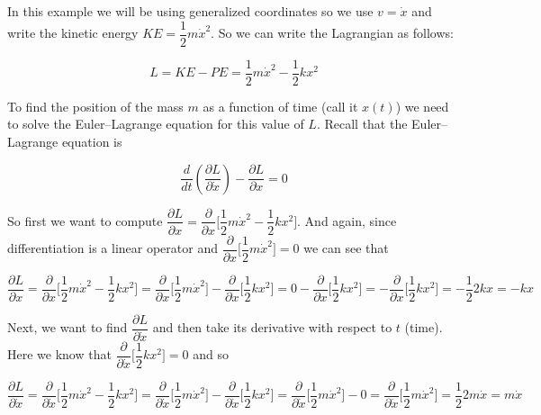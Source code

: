 \documentclass{article}
\theoremstyle{definition}
\begin{document}
\noindent
In this example we will be using generalized coordinates so we
use $v = \dot{x}$ and write the kinetic energy $KE = \dfrac{1}{2}
m \dot{x}^2$. So we can write the Lagrangian as follows:

\bigskip
\begin{equation*}
L = KE - PE = \dfrac{1}{2} m \dot{x}^2 - \dfrac{1}{2} k x^2
\end{equation*}


\bigskip
\noindent
To find the position of the mass $m$ as a function of time (call
it $x(t)$) we need to solve the Euler–Lagrange equation for this
value of $L$. Recall that the  Euler–Lagrange equation is


\bigskip
\begin{equation*}
\dfrac{d}{dt} \left ( \dfrac{\partial L}{\partial \dot{x}} \right ) -  \dfrac{\partial L}{\partial x} = 0
\end{equation*}

\bigskip
\noindent
So first we want to compute $\dfrac{\partial L}{\partial x} =
\dfrac{\partial}{\partial x}  \bigg [ \dfrac{1}{2} m \dot{x}^2  -
\dfrac{1}{2} k x^2 \bigg ]$. And again, since differentiation 
is a linear operator and $\dfrac{\partial}{\partial x} \bigg 
[\dfrac{1}{2} m \dot{x}^2 \bigg ] = 0$ we can see that  

\bigskip
\begin{equation*}
\dfrac{\partial L}{\partial x} = \dfrac{\partial}{\partial x}  \bigg [ \dfrac{1}{2} m \dot{x}^2  - \dfrac{1}{2} k x^2 \bigg ] 
= \dfrac{\partial}{\partial x} \bigg [\dfrac{1}{2} m \dot{x}^2  \bigg ] - \dfrac{\partial}{\partial x} \bigg [\dfrac{1}{2} k x^2  \bigg ]  
=  0 - \dfrac{\partial}{\partial x} \bigg [\dfrac{1}{2} k x^2  \bigg ] 
= - \dfrac{\partial}{\partial x} \bigg [ \dfrac{1}{2} k x^2  \bigg ]  
= - \dfrac{1}{2} 2 k x = -kx
\end{equation*}

\bigskip
\noindent
Next, we want to find  $\dfrac{\partial L}{\partial \dot{x}}$ and
then take its derivative with respect to $t$ (time). Here we know
that $\dfrac{\partial}{\partial \dot{x}} \Bigg [ \dfrac{1}{2} k
x^2 \Bigg ] = 0$ and so 


\begin{equation*}
\dfrac{\partial L}{\partial \dot{x}} = \dfrac{\partial}{\partial \dot{x}} \Bigg [   \dfrac{1}{2} m \dot{x}^2 - \dfrac{1}{2} k x^2 \Bigg ] 
= \dfrac{\partial}{\partial \dot{x}} \Bigg [ \dfrac{1}{2} m \dot{x}^2 \Bigg ] - \dfrac{\partial}{\partial \dot{x}} \Bigg [  \dfrac{1}{2} k x^2 \Bigg ] 
= \dfrac{\partial}{\partial \dot{x}} \Bigg [  \dfrac{1}{2} m \dot{x}^2 \Bigg ]  - 0
= \dfrac{\partial}{\partial \dot{x}} \Bigg [  \dfrac{1}{2} m \dot{x}^2 \Bigg ] =  \dfrac{1}{2} 2 m \dot{x} = m \dot{x}
\end{equation*}
\end{document}
